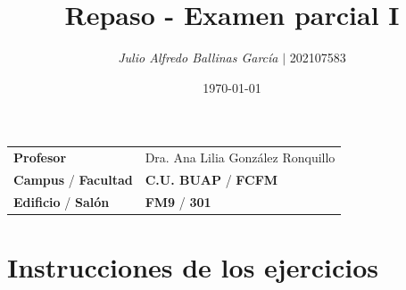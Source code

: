 \documentclass{article}
\title{Repaso - Examen parcial I}
\author{\emph{Julio Alfredo Ballinas García} $\boldsymbol{\mid}$ 202107583}
\date{\today}
\begin{document}
\maketitle



\begin{mybox}
\noindent\begin{tabular}{@{}ll}
	{\bfseries{Profesor}} & Dra. Ana Lilia González Ronquillo\\
	\textcolor{prussianblue}{\bfseries{Campus}} / \textcolor{trueblue}{\bfseries{Facultad}}  & \textcolor{prussianblue}{\bfseries{C.U. BUAP}} /  \textcolor{trueblue}{\bfseries{FCFM}} \\
	\textcolor{prussianblue}{\bfseries{Edificio}} /  \textcolor{trueblue}{\bfseries{Salón}}    & 	\textcolor{prussianblue}{\bfseries{FM9}} /  \textcolor{trueblue}{\bfseries{301}}   
\end{tabular} 
\end{mybox} \vspace{1cm}

\section{Instrucciones de los ejercicios}
\end{document}
